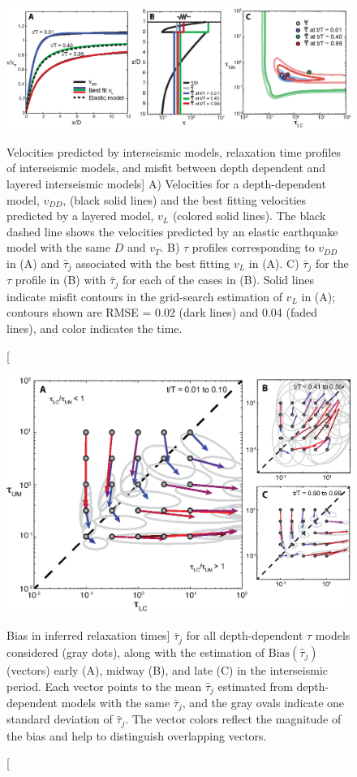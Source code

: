 \begin{figure}
\includegraphics{ch1/figures/Figure2.eps}
\caption
[Velocities predicted by interseismic models, relaxation time profiles
of interseismic models, and misfit between depth dependent and layered
interseismic models]
{A) Velocities for a depth-dependent model, $v_{DD}$, (black
solid lines) and the best fitting velocities predicted by a layered
model, $v_{L}$ (colored solid lines). The black dashed line shows the
velocities predicted by an elastic earthquake model with the same $D$
and $v_{T}$.  B) $\tau$ profiles corresponding to $v_{DD}$ in (A) and
$\hat{\tau}_j$ associated with the best fitting $v_{L}$ in (A).  C)
$\bar{\tau}_j$ for the $\tau$ profile in (B) with $\hat{\tau}_j$ for
each of the cases in (B). Solid lines indicate misfit contours in the
grid-search estimation of $v_{L}$ in (A); contours shown are RMSE =
0.02 (dark lines) and 0.04 (faded lines), and color indicates the
time.}
\label{ch1:fig:2}
\end{figure}

\begin{figure}
\includegraphics{ch1/figures/Figure3.eps}
\caption
[Bias in inferred relaxation times]
{$\bar{\tau}_j$ for all depth-dependent $\tau$ models considered (gray
dots), along with the estimation of $\mathrm{Bias}(\hat{\tau}_j)$
(vectors) early (A), midway (B), and late (C) in the interseismic
period.  Each vector points to the mean $\hat{\tau}_j$ estimated from
depth-dependent models with the same $\bar{\tau}_j$, and the gray
ovals indicate one standard deviation of $\hat{\tau}_j$.  The vector
colors reflect the magnitude of the bias and help to distinguish
overlapping vectors.}
\label{ch1:fig:3} 
\end{figure}

